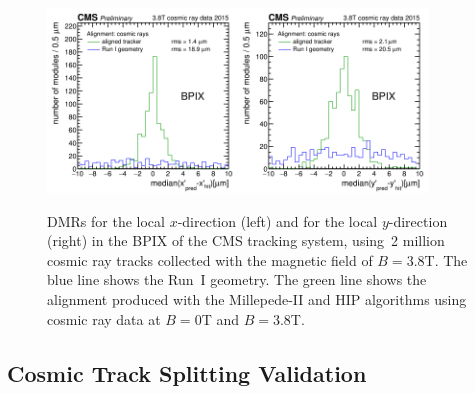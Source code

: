 \begin{figure}[htb]
    \begin{center}
        \includegraphics[width=0.45\textwidth]{../figs/Alignment/AlRes_CRAFT_DmedianR_BPIX_plain.png}\includegraphics[width=0.45\textwidth]{../figs/Alignment/AlRes_CRAFT_DmedianYR_BPIX_plain.png}
    \end{center}
    \caption {DMRs for the local $x$-direction (left) and for the local $y$-direction (right) in the BPIX of the CMS tracking system, using~2 million cosmic ray tracks collected with the magnetic field of $B=3.8$T. The blue line shows the Run~I geometry. The green line shows the alignment produced with the Millepede-II and HIP algorithms using cosmic ray data at $B=0$T and $B=3.8$T.}
    \label{fig:DMRs}
\end{figure}

\subsection{Cosmic Track Splitting Validation}
\label{sec:AlRes_trackSplit}


